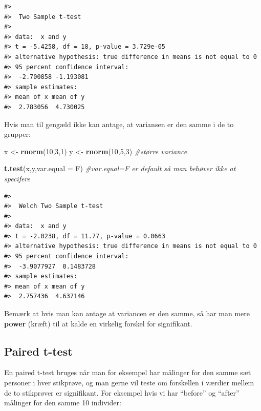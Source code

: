 \documentclass[
]{book}
\newenvironment{Shaded}{\begin{snugshade}}{\end{snugshade}}
\newcommand{\AttributeTok}[1]{\textcolor[rgb]{0.27,0.27,0.27}{#1}}
\newcommand{\CommentTok}[1]{\textcolor[rgb]{0.37,0.37,0.37}{\textit{#1}}}
\newcommand{\DecValTok}[1]{\textcolor[rgb]{0.06,0.06,0.06}{#1}}
\newcommand{\FunctionTok}[1]{\textcolor[rgb]{0.27,0.27,0.27}{\textbf{#1}}}
\newcommand{\NormalTok}[1]{#1}
\newcommand{\OtherTok}[1]{\textcolor[rgb]{0.37,0.37,0.37}{#1}}
\begin{document}
\begin{verbatim}
#> 
#>  Two Sample t-test
#> 
#> data:  x and y
#> t = -5.4258, df = 18, p-value = 3.729e-05
#> alternative hypothesis: true difference in means is not equal to 0
#> 95 percent confidence interval:
#>  -2.700858 -1.193081
#> sample estimates:
#> mean of x mean of y 
#>  2.783056  4.730025
\end{verbatim}

Hvis man til gengæld ikke kan antage, at variansen er den samme i de to grupper:

\begin{Shaded}
\begin{Highlighting}[]
\NormalTok{x }\OtherTok{\textless{}{-}} \FunctionTok{rnorm}\NormalTok{(}\DecValTok{10}\NormalTok{,}\DecValTok{3}\NormalTok{,}\DecValTok{1}\NormalTok{)}
\NormalTok{y }\OtherTok{\textless{}{-}} \FunctionTok{rnorm}\NormalTok{(}\DecValTok{10}\NormalTok{,}\DecValTok{5}\NormalTok{,}\DecValTok{3}\NormalTok{) }\CommentTok{\#større variance}

\FunctionTok{t.test}\NormalTok{(x,y,}\AttributeTok{var.equal =}\NormalTok{ F) }\CommentTok{\#var.equal=F er \textquotesingle{}default\textquotesingle{} så man behøver ikke at specifere}
\end{Highlighting}
\end{Shaded}

\begin{verbatim}
#> 
#>  Welch Two Sample t-test
#> 
#> data:  x and y
#> t = -2.0238, df = 11.77, p-value = 0.0663
#> alternative hypothesis: true difference in means is not equal to 0
#> 95 percent confidence interval:
#>  -3.9077927  0.1483728
#> sample estimates:
#> mean of x mean of y 
#>  2.757436  4.637146
\end{verbatim}

Bemærk at hvis man kan antage at variancen er den samme, så har man mere \textbf{power} (kræft) til at kalde en virkelig forskel for signifikant.

\subsection{Paired t-test}\label{paired-t-test}

En paired t-test bruges når man for eksempel har målinger for den samme sæt personer i hver stikprøve, og man gerne vil teste om forskellen i værdier mellem de to stikprøver er signifikant. For eksempel hvis vi har ``before'' og ``after'' målinger for den samme 10 individer:
\end{document}
